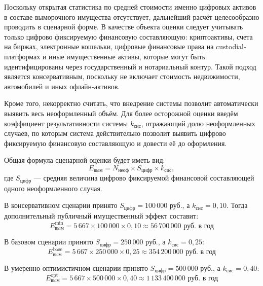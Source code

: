 Поскольку открытая статистика по средней стоимости именно цифровых активов в составе выморочного имущества отсутствует, дальнейший расчёт целесообразно проводить в сценарной форме. В качестве объекта оценки следует учитывать только цифрово фиксируемую финансовую составляющую: криптоактивы, счета на биржах, электронные кошельки, цифровые финансовые права на custodial-платформах и иные имущественные активы, которые могут быть идентифицированы через государственный и нотариальный контур. Такой подход является консервативным, поскольку не включает стоимость недвижимости, автомобилей и иных офлайн-активов.

Кроме того, некорректно считать, что внедрение системы позволит автоматически выявить весь неоформленный объём. Для более осторожной оценки введём коэффициент результативности системы $k_{\text{сис}}$, отражающий долю неоформленных случаев, по которым система действительно позволит выявить цифрово фиксируемую финансовую составляющую и довести её до оформления.

Общая формула сценарной оценки будет иметь вид:
\begin{equation}
E_{\text{вым}} = N_{\text{неоф}} \times S_{\text{цифр}} \times k_{\text{сис}},
\label{eq:escheat-effect-formula}
\end{equation}
где $S_{\text{цифр}}$ --- средняя величина цифрово фиксируемой финансовой составляющей одного неоформленного случая.

В консервативном сценарии принято $S_{\text{цифр}} = 100\,000$ руб., а $k_{\text{сис}} = 0{,}10$. Тогда дополнительный публичный имущественный эффект составит:
\begin{equation}
E_{\text{вым}}^{\min} =
5\,667 \times 100\,000 \times 0{,}10
\approx 56\,700\,000 \text{ руб. в год}
\label{eq:escheat-conservative-effect}
\end{equation}

В базовом сценарии принято $S_{\text{цифр}} = 250\,000$ руб., а $k_{\text{сис}} = 0{,}25$:
\begin{equation}
E_{\text{вым}}^{\text{base}} =
5\,667 \times 250\,000 \times 0{,}25
\approx 354\,200\,000 \text{ руб. в год}
\label{eq:escheat-base-effect}
\end{equation}

В умеренно-оптимистичном сценарии принято $S_{\text{цифр}} = 500\,000$ руб., а $k_{\text{сис}} = 0{,}40$:
\begin{equation}
E_{\text{вым}}^{\text{opt}} =
5\,667 \times 500\,000 \times 0{,}40
\approx 1\,133\,400\,000 \text{ руб. в год}
\label{eq:escheat-optimistic-effect}
\end{equation}

